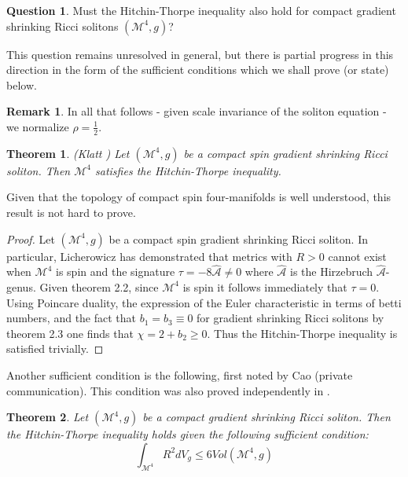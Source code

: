 \documentclass[openany, amssymb, psamsfonts]{amsart}
\newtheorem{thm}{Theorem}[section]
\theoremstyle{definition}
\newtheorem{quest}{Question}[section]
\newtheorem{rem}{Remark}[section]
\numberwithin{equation}{section}
\begin{document}
    \begin{quest}
    Must the Hitchin-Thorpe inequality also hold for compact gradient shrinking Ricci solitons $(\mathcal{M}^4, g)$? 
    \end{quest}


    This question remains unresolved in general, but there is partial progress in this direction in the form of the sufficient conditions which we shall prove (or state) below.
    
\begin{rem}
In all that follows - given scale invariance of the soliton equation - we normalize $\rho = \frac{1}{2}$. 
\end{rem}

    \begin{thm} (Klatt \cite{klatt})
    Let $(\mathcal{M}^4, g)$ be a compact spin gradient shrinking Ricci soliton. Then $\mathcal{M}^4$ satisfies the Hitchin-Thorpe inequality. 
    \end{thm}

Given that the topology of compact spin four-manifolds is well understood, this result is not hard to prove. 

\begin{proof}
Let $(\mathcal{M}^4, g)$ be a compact spin gradient shrinking Ricci soliton. In particular, Licherowicz \cite{lich} has demonstrated that metrics with $R > 0$ cannot exist when $\mathcal{M}^4$ is spin and the signature $\tau = -8\hat{\mathcal{A}} \neq 0$ where $\hat{\mathcal{A}}$ is the Hirzebruch $\hat{\mathcal{A}}$-genus. Given theorem 2.2, since $\mathcal{M}^4$ is spin it follows immediately that $\tau = 0$. Using Poincare duality, the expression of the Euler characteristic in terms of betti numbers, and the fact that $b_1 = b_3 \equiv 0$ for gradient shrinking Ricci solitons by theorem 2.3 one finds that $\chi = 2 + b_2 \geq 0$. Thus the Hitchin-Thorpe inequality is satisfied trivially. 
\end{proof}

Another sufficient condition is the following, first noted by Cao (private communication). This condition was also proved independently in \cite{aldir}. 

\begin{thm} Let $(\mathcal{M}^4, g)$ be a compact gradient shrinking Ricci soliton. Then the Hitchin-Thorpe inequality holds given the following sufficient condition: $$\int_{\mathcal{M}^4} R^2 dV_g \leq 6 Vol(\mathcal{M}^4, g)$$

\end{thm}
\end{document}
